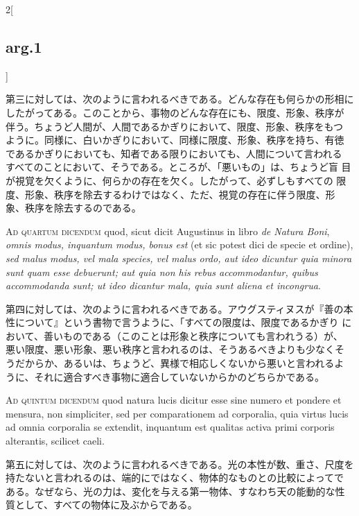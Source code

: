 \documentclass[paper=a4paper,fontsize=10pt,jafontsize=9pt,titlepage]{jlreq}
\begin{document}
\begin{paracol}{2}[\subsection{arg.1}]
\switchcolumn

第三に対しては、次のように言われるべきである。どんな存在も何らかの形相に
 したがってある。このことから、事物のどんな存在にも、限度、形象、秩序が
 伴う。ちょうど人間が、人間であるかぎりにおいて、限度、形象、秩序をもつ
 ように。同様に、白いかぎりにおいて、同様に限度、形象、秩序を持ち、有徳
 であるかぎりにおいても、知者である限りにおいても、人間について言われる
 すべてのことにおいて、そうである。ところが、「悪いもの」は、ちょうど盲
 目が視覚を欠くように、何らかの存在を欠く。したがって、必ずしもすべての
 限度、形象、秩序を除去するわけではなく、ただ、視覚の存在に伴う限度、形
 象、秩序を除去するのである。

\switchcolumn*[\subsection{ad.4}]

{\scshape Ad quartum dicendum} quod, sicut dicit Augustinus in libro
 {\itshape de Natura Boni}, {\itshape omnis modus, inquantum modus,
 bonus est} (et sic potest dici de specie et ordine), {\itshape sed
 malus modus, vel mala species, vel malus ordo, aut ideo dicuntur quia
 minora sunt quam esse debuerunt; aut quia non his rebus accommodantur,
 quibus accommodanda sunt; ut ideo dicantur mala, quia sunt aliena et
 incongrua}.

\switchcolumn

第四に対しては、次のように言われるべきである。アウグスティヌスが『善の本
 性について』という書物で言うように、「すべての限度は、限度であるかぎり
 において、善いものである（このことは形象と秩序についても言われうる）が、
 悪い限度、悪い形象、悪い秩序と言われるのは、そうあるべきよりも少なくそ
 うだからか、あるいは、ちょうど、異様で相応しくないから悪いと言われるよ
 うに、それに適合すべき事物に適合していないからかのどちらかである。

\switchcolumn*[\subsection{ad.5}]

{\scshape Ad quintum dicendum} quod natura lucis dicitur esse sine numero et
 pondere et mensura, non simpliciter, sed per comparationem ad
 corporalia, quia virtus lucis ad omnia corporalia se extendit,
 inquantum est qualitas activa primi corporis alterantis, scilicet
 caeli.

\switchcolumn

第五に対しては、次のように言われるべきである。光の本性が数、重さ、尺度を
 持たないと言われるのは、端的にではなく、物体的なものとの比較によってで
 ある。なぜなら、光の力は、変化を与える第一物体、すなわち天の能動的な性
 質として、すべての物体に及ぶからである。

\end{paracol}
\end{document}
